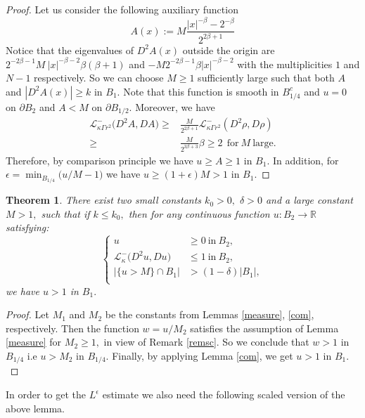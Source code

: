 \documentclass{amsart}
\newtheorem{theorem}{Theorem}[section]
\theoremstyle{plain}
\numberwithin{equation}{section}
\begin{document}
\begin{proof}
Let us consider the following auxiliary function
\[A(x):=M\frac{|x|^{-\beta}-2^{-\beta}}{2^{2\beta+1}}\]
Notice that the eigenvalues of $D^{2}A(x)$ outside the origin are $2^{-2\beta-1}M~|x|^{-\beta-2}\beta(\beta+1)$ and $-M2^{-2\beta-1}\beta|x|^{-\beta-2}$ with the multiplicities $1$ and $N-1$ respectively. So we can choose $M\geq1$ sufficiently large such that both $A$ and $|D^{2}A(x)|\geq k$ in $B_{1}.$ Note that this function is smooth in $B^{c}_{1/4}$ and $u=0$ on $\partial B_{2}$ and $A<M$ on $\partial B_{1/2}.$ Moreover, we have 
\begin{equation*}
\begin{aligned}
\mathcal{L}_{\kappa\Gamma r^{2}}^{-}\big(D^{2}A, DA\big)\geq& \frac{M}{2^{2\beta+1}}\mathcal{L}_{\kappa\Gamma r^{2}}^{-}(D^{2}\rho, D\rho)\\
\geq &\frac{M}{2^{3\beta+3}}\beta \geq 2~~\text{for}~M~\text{large}.
\end{aligned} 
\end{equation*}
Therefore, by comparison principle we have $u\geq A\geq 1$ in $B_{1}.$  In addition, for $\epsilon=\min_{B_{1/4}}\big(u/M-1\big)$ we have $u\geq (1+\epsilon)M>1$ in $B_{1}.$
\end{proof}
\begin{theorem}\label{corols}
There exist two small constants $k_{0}>0,$ $\delta>0$ and a large constant $M>1,$ such that if $k\leq k_{0},$ then for any continuous function $u:B_{2}\longrightarrow\mathbb{R}$ satisfying:
\begin{equation*}
\left\{
\begin{aligned}
u&\geq0~\text{in}~B_{2},\\
\mathcal{L}_{\kappa}^{-}\big(D^{2}u, Du\big)&\leq 1~\text{in}~B_{2},\\ 
|\{u>M\}\cap B_{1}|&>(1-\delta)|B_{1}|,\\
\end{aligned}
\right.
\end{equation*}
we have $u>1$ in $B_{1}.$
\end{theorem}
\begin{proof}
Let $M_{1}$ and $M_{2}$ be the constants from Lemmas \ref{measure}, \ref{com}, respectively. Then the function $w=u/M_{2}$ satisfies the assumption of Lemma \ref{measure} for $M_{2}\geq 1,$ in view of Remark \ref{remsc}. So we conclude that $w>1$ in $B_{1/4}$ i.e $u>M_{2}$ in $B_{1/4}.$ Finally, by applying Lemma \ref{com}, we get $u>1$ in $B_{1}.$ 
\end{proof}
In order to get the $L^{\epsilon}$ estimate we also need the following scaled version of the above lemma. 
\end{document}
